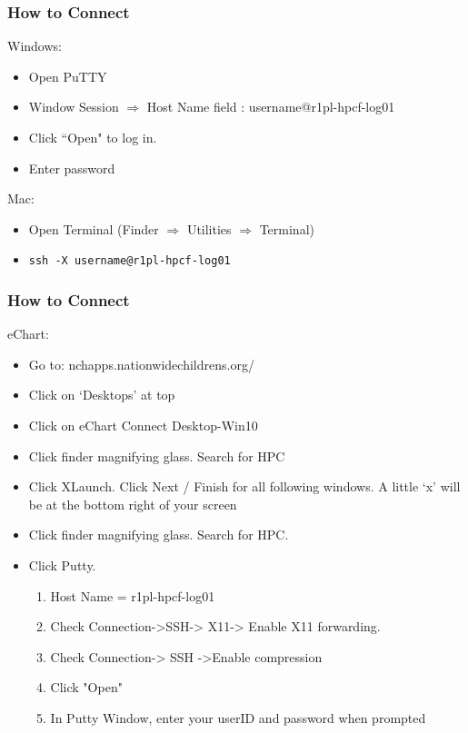 \documentclass{beamer}
\newcommand{\code}[1]{\colorbox{codegray}{\texttt{#1}}}
\begin{document}
\begin{frame}
\frametitle{How to Connect}
Windows:
\begin{itemize}
    \item Open PuTTY
    \item Window Session $\Rightarrow$ Host Name field : username@r1pl-hpcf-log01
    \item Click ``Open" to log in.
    \item Enter password
\end{itemize}

\pause

Mac:
\begin{itemize}
    \item Open Terminal (Finder $\Rightarrow$ Utilities $\Rightarrow$ Terminal)
    \item \code{ssh -X username@r1pl-hpcf-log01}
\end{itemize}
\end{frame}

\begin{frame}
\frametitle{How to Connect}
eChart:
\begin{itemize}
    \item Go to: nchapps.nationwidechildrens.org/
    \pause
    \item Click on ‘Desktops’ at top
    \pause
    \item Click on eChart Connect Desktop-Win10
    \pause
    \item Click finder magnifying glass. Search for HPC
    \pause
    \item Click XLaunch. Click Next / Finish for all following windows.  A little ‘x’ will
          be at the bottom right of your screen
    \pause
    \item Click finder magnifying glass. Search for HPC.
    \pause
    \item Click Putty. 
    \pause
    \begin{enumerate}
        \item Host Name = r1pl-hpcf-log01
        \pause
        \item Check Connection->SSH-> X11-> Enable X11 forwarding. 
        \pause
        \item Check Connection-> SSH ->Enable compression
        \pause
        \item Click "Open"
        \pause
        \item In Putty Window, enter your userID and password when prompted
    \end{enumerate}
\end{itemize}
\end{frame}
\end{document}
